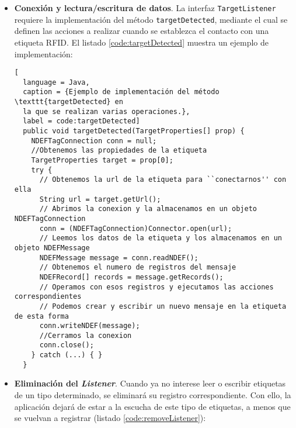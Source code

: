 \begin{itemize}
\begin{lstlisting}[
  language = Java,
  caption = {Se añade un \emph{Listener} para etiquetas \texttt{NDEF} y otro
  para etiquetas \texttt{NDEF} del tipo ``app/mi\_tipo''.},
  label = code:addListener]
  try{
    DiscoveryManager.getInstance().addTargetListener(this, TargetType.NDEF_TAG);
    DiscoveryManager.getInstance().addNDEFRecordListener(this, new NDEFRecordType(NDEFRecordType.MIME, ``app/mi_tipo''));
  } catch(ContactlessException e) { }
\end{lstlisting}

\item \textbf{Conexión y lectura/escritura de datos}. La  interfaz
\texttt{TargetListener} requiere la implementación del método
\texttt{targetDetected}, mediante el cual se definen las acciones a realizar 
cuando se establezca el contacto con una etiqueta \acs{RFID}. El listado
\ref{code:targetDetected} muestra un ejemplo de implementación:

\begin{lstlisting}[
  language = Java,
  caption = {Ejemplo de implementación del método \texttt{targetDetected} en
  la que se realizan varias operaciones.},
  label = code:targetDetected]
  public void targetDetected(TargetProperties[] prop) {
    NDEFTagConnection conn = null;
    //Obtenemos las propiedades de la etiqueta
    TargetProperties target = prop[0];
    try {
      // Obtenemos la url de la etiqueta para ``conectarnos'' con ella
      String url = target.getUrl();
      // Abrimos la conexion y la almacenamos en un objeto NDEFTagConnection
      conn = (NDEFTagConnection)Connector.open(url);
      // Leemos los datos de la etiqueta y los almacenamos en un objeto NDEFMessage
      NDEFMessage message = conn.readNDEF();
      // Obtenemos el numero de registros del mensaje
      NDEFRecord[] records = message.getRecords();
      // Operamos con esos registros y ejecutamos las acciones correspondientes
      // Podemos crear y escribir un nuevo mensaje en la etiqueta de esta forma
      conn.writeNDEF(message);
      //Cerramos la conexion
      conn.close();
    } catch (...) { }
  }
\end{lstlisting}

\item \textbf{Eliminación del \emph{Listener}}. Cuando ya no interese leer o 
escribir etiquetas de un tipo determinado, se eliminará su registro 
correspondiente. Con ello, la aplicación dejará de estar a la escucha de este 
tipo de etiquetas, a menos que se vuelvan a registrar (listado
\ref{code:removeListener}):


\end{itemize}
